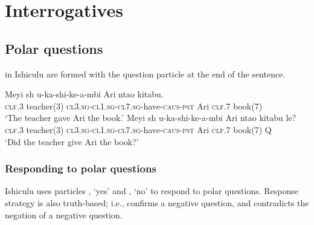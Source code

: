 \chapter{Interrogatives}

\section{Polar questions}

 in Ishiculu are formed with the question particle \textit{} at the end of the sentence.

\begin{exe}
\ex
\begin{xlist}
\ex
\gll Meyi {sh\textramshorns} u-ka-shi-ke-\textbeltl a-mbi Ari nta\textbeltl o kitabu. \\
\textsc{clf.3} teacher(3) \textsc{cl3.sg}-\textsc{cl1.sg}-\textsc{cl7.sg}-have-\textsc{caus}-\textsc{pst} Ari \textsc{clf.7} book(7) \\
\trans `The teacher gave Ari the book.'
\ex
\gll Meyi {sh\textramshorns} u-ka-shi-ke-\textbeltl a-mbi Ari nta\textbeltl o kitabu le? \\
\textsc{clf.3} teacher(3) \textsc{cl3.sg}-\textsc{cl1.sg}-\textsc{cl7.sg}-have-\textsc{caus}-\textsc{pst} Ari \textsc{clf.7} book(7) Q \\
\trans `Did the teacher give Ari the book?'
\end{xlist}
\end{exe}

\subsection{Responding to polar questions}

Ishiculu uses particles \textit{}, `yes' and \textit{}, `no' to respond to polar questions. Response strategy is also truth-based; i.e., \textit{} confirms a negative question, and \textit{} contradicts the negation of a negative question.

